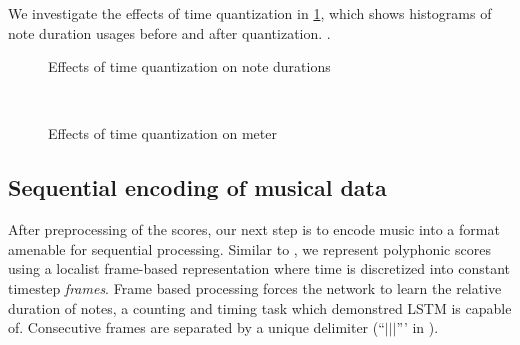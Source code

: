 We investigate the effects of time quantization in
\cref{fig:note-lengths-time-quantization}, which shows histograms of note
duration usages before and after quantization. .

\begin{figure}[tb]
    \centering
    \begin{subfigure}[t]{0.48\textwidth}
        \centering
        
    \end{subfigure}
    \begin{subfigure}[t]{0.48\textwidth}
        \centering
        
    \end{subfigure}
    \caption{Effects of time quantization on note durations}
    \label{fig:note-lengths-time-quantization}
\end{figure}

\begin{figure}[tb]
    \centering
    \begin{subfigure}[t]{0.48\textwidth}
        \centering
        
    \end{subfigure}
    ~
    \begin{subfigure}[t]{0.48\textwidth}
        \centering
        
    \end{subfigure}
    \caption{Effects of time quantization on meter}
    \label{fig:meter-time-quantization}
\end{figure}

\subsection{Sequential encoding of musical data}

After preprocessing of the scores, our next step is to encode music into a
format amenable for sequential processing. Similar to
\citep{todd1989connectionist}, we represent polyphonic scores using a localist
frame-based representation where time is discretized into constant timestep
\emph{frames}. Frame based processing forces the network to learn the relative
duration of notes, a counting and timing task which \citep{gers2002learning}
demonstred LSTM is capable of. Consecutive frames are separated by a unique
delimiter (``$|||$''' in ).

